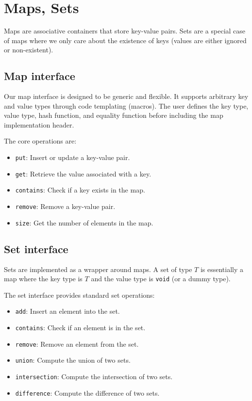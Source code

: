 \chapter{Maps, Sets}\label{chap:maps}

Maps are associative containers that store key-value pairs. Sets are a special case of maps where we only care about the existence of keys (values are either ignored or non-existent).

\section{Map interface}

Our map interface is designed to be generic and flexible. It supports arbitrary key and value types through code templating (macros). The user defines the key type, value type, hash function, and equality function before including the map implementation header.

The core operations are:
\begin{itemize}
    \item \texttt{put}: Insert or update a key-value pair.
    \item \texttt{get}: Retrieve the value associated with a key.
    \item \texttt{contains}: Check if a key exists in the map.
    \item \texttt{remove}: Remove a key-value pair.
    \item \texttt{size}: Get the number of elements in the map.
\end{itemize}

\section{Set interface}

Sets are implemented as a wrapper around maps. A set of type $T$ is essentially a map where the key type is $T$ and the value type is \texttt{void} (or a dummy type).

The set interface provides standard set operations:
\begin{itemize}
    \item \texttt{add}: Insert an element into the set.
    \item \texttt{contains}: Check if an element is in the set.
    \item \texttt{remove}: Remove an element from the set.
    \item \texttt{union}: Compute the union of two sets.
    \item \texttt{intersection}: Compute the intersection of two sets.
    \item \texttt{difference}: Compute the difference of two sets.
\end{itemize}
